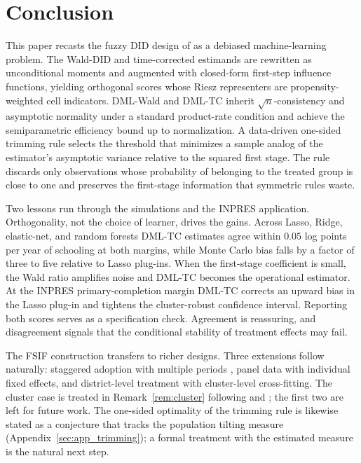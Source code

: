\section{Conclusion}\label{sec:7}

This paper recasts the fuzzy DID design of \citet{fuzzy2018} as a debiased machine-learning problem. The Wald-DID and time-corrected estimands are rewritten as unconditional moments and augmented with closed-form first-step influence functions, yielding orthogonal scores whose Riesz representers are propensity-weighted cell indicators. DML-Wald and DML-TC inherit $\sqrt{n}$-consistency and asymptotic normality under a standard product-rate condition and achieve the semiparametric efficiency bound up to normalization. A data-driven one-sided trimming rule selects the threshold that minimizes a sample analog of the estimator's asymptotic variance relative to the squared first stage. The rule discards only observations whose probability of belonging to the treated group is close to one and preserves the first-stage information that symmetric rules waste.

Two lessons run through the simulations and the INPRES application. Orthogonality, not the choice of learner, drives the gains. Across Lasso, Ridge, elastic-net, and random forests DML-TC estimates agree within $0.05$ log points per year of schooling at both margins, while Monte Carlo bias falls by a factor of three to five relative to Lasso plug-ins. When the first-stage coefficient is small, the Wald ratio amplifies noise and DML-TC becomes the operational estimator. At the INPRES primary-completion margin DML-TC corrects an upward bias in the Lasso plug-in and tightens the cluster-robust confidence interval. Reporting both scores serves as a specification check. Agreement is reassuring, and disagreement signals that the conditional stability of treatment effects may fail.

The FSIF construction transfers to richer designs. Three extensions follow naturally: staggered adoption with multiple periods \citep{callaway2023ddml}, panel data with individual fixed effects, and district-level treatment with cluster-level cross-fitting. The cluster case is treated in Remark~\ref{rem:cluster} following \citet{chiang2022multiway} and \citet{belloni2017program}; the first two are left for future work. The one-sided optimality of the trimming rule is likewise stated as a conjecture that tracks the population tilting measure (Appendix~\ref{sec:app_trimming}); a formal treatment with the estimated measure is the natural next step.

